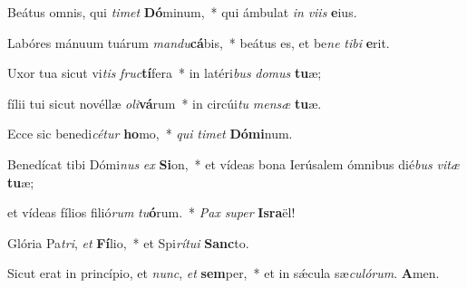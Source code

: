 \item Beátus omnis, qui \textit{ti}\textit{met} \textbf{Dó}minum,~* qui ámbulat \textit{in} \textit{vi}\textit{is} \textbf{e}ius.

\item Labóres mánuum tuárum \textit{man}\textit{du}\textbf{cá}bis,~* beátus es, et be\textit{ne} \textit{ti}\textit{bi} \textbf{e}rit.

\item Uxor tua sicut vi\textit{tis} \textit{fruc}\textbf{tí}fera~* in latéri\textit{bus} \textit{do}\textit{mus} \textbf{tu}æ;

\item fílii tui sicut novéllæ \textit{o}\textit{li}\textbf{vá}rum~* in circúi\textit{tu} \textit{men}\textit{sæ} \textbf{tu}æ.

\item Ecce sic benedi\textit{cé}\textit{tur} \textbf{ho}mo,~* \textit{qui} \textit{ti}\textit{met} \textbf{Dó}\textbf{mi}num.

\item Benedícat tibi Dómi\textit{nus} \textit{ex} \textbf{Si}on,~* et vídeas bona Ierúsalem ómnibus dié\textit{bus} \textit{vi}\textit{tæ} \textbf{tu}æ;

\item et vídeas fílios filió\textit{rum} \textit{tu}\textbf{ó}rum.~* \textit{Pax} \textit{su}\textit{per} \textbf{Is}\textbf{ra}ël!

\item Glória Pa\textit{tri}, \textit{et} \textbf{Fí}lio,~* et Spi\textit{rí}\textit{tu}\textit{i} \textbf{Sanc}to.

\item Sicut erat in princípio, et \textit{nunc}, \textit{et} \textbf{sem}per,~* et in sǽcula sæ\textit{cu}\textit{ló}\textit{rum}. \textbf{A}men.